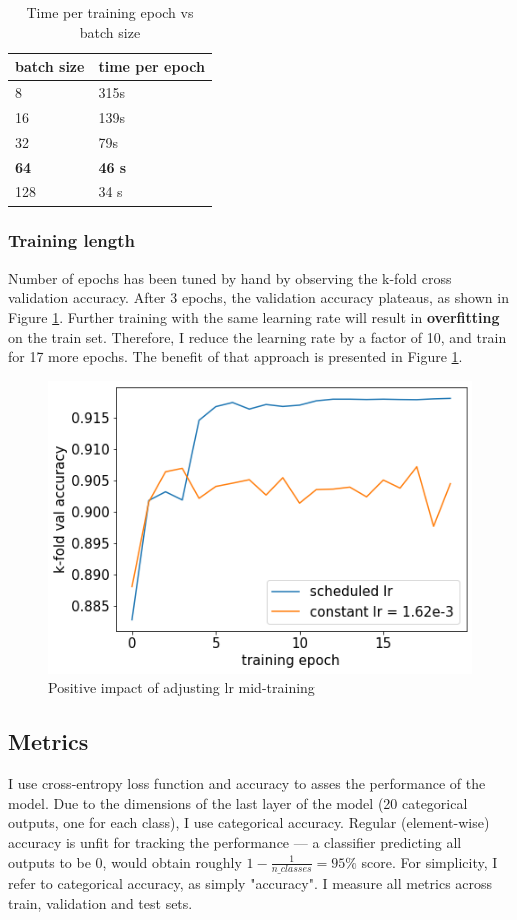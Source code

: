 \documentclass[journal,12pt,onecolumn]{IEEEtran}
\begin{document}
\begin{table}[h]
\centering
\begin{tabular}{|l|l|}
\hline
batch size & time per epoch \\ \hline
8 & 315s \\ \hline
16 & 139s \\ \hline
32 & 79s \\ \hline
\textbf{64} & \textbf{46 s} \\ \hline
128 & 34 s \\ \hline
\end{tabular}
\caption{Time per training epoch vs batch size}
\label{table:batch}
\end{table}

\subsubsection{Training length}\label{sec:scheduling}
Number of epochs has been tuned by hand by observing the k-fold cross validation accuracy. After 3 epochs, the validation accuracy plateaus, as shown in Figure \ref{fig:plateau}. Further training with the same learning rate will result in \textbf{overfitting} on the train set. Therefore, I reduce the learning rate by a factor of 10, and train for 17 more epochs. The benefit of that approach is presented in Figure \ref{fig:plateau}. 
 

\begin{figure}[h]
    \centering
    \includegraphics[width=0.5\linewidth]{lr_schedule.png}
    \caption{Positive impact of adjusting lr mid-training}
    \label{fig:plateau}
\end{figure}

\subsection{Metrics}
I use cross-entropy loss function and accuracy to asses the performance of the model. Due to the dimensions of the last layer of the model (20 categorical outputs, one for each class), I use categorical accuracy. Regular (element-wise) accuracy is unfit for tracking the performance --- a classifier predicting all outputs to be 0, would  obtain roughly $1-\frac{1}{n\_classes} = 95\% $ score. For simplicity, I refer to categorical accuracy, as simply "accuracy". I measure all metrics across train, validation and test sets. 
\end{document}
